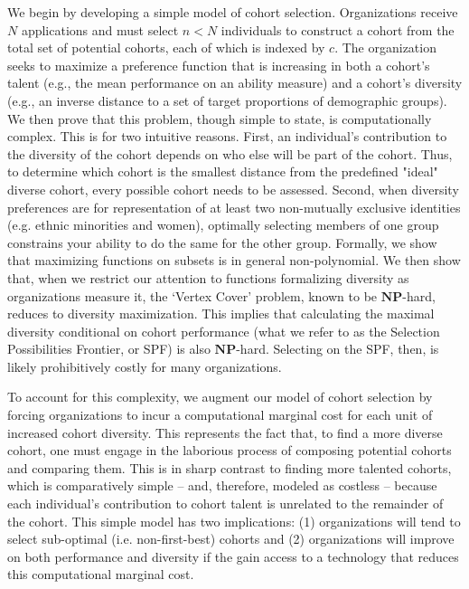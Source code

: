We begin by developing a simple model of cohort selection. Organizations receive $N$ applications and must select $n<N$ individuals to construct a cohort from the total set of potential cohorts, each of which is indexed by $c$. The organization seeks to maximize a preference function that is increasing in both a cohort's talent (e.g., the mean performance on an ability measure) and a cohort's diversity (e.g., an inverse distance to a set of target proportions of demographic groups). We then prove that this problem, though simple to state, is computationally complex. This is for two intuitive reasons. First, an individual's contribution to the diversity of the cohort depends on who else will be part of the cohort. Thus, to determine which cohort is the smallest distance from the predefined "ideal" diverse cohort, every possible cohort needs to be assessed. Second, when diversity preferences are for representation of at least two non-mutually exclusive identities (e.g. ethnic minorities and women), optimally selecting members of one group constrains your ability to do the same for the other group. Formally, we show that maximizing functions on subsets is in general non-polynomial. We then show that, when we restrict our attention to functions formalizing diversity as organizations measure it, the `Vertex Cover' problem, known to be $\mathbf{NP}$-hard, reduces to diversity maximization. This implies that calculating the maximal diversity conditional on cohort performance (what we refer to as the Selection Possibilities Frontier, or SPF) is also $\mathbf{NP}$-hard. Selecting on the SPF, then, is likely prohibitively costly for many organizations. 

To account for this complexity, we augment our model of cohort selection by forcing organizations to incur a computational marginal cost for each unit of increased cohort diversity. This represents the fact that, to find a more diverse cohort, one must engage in the laborious process of composing potential cohorts and comparing them. This is in sharp contrast to finding more talented cohorts, which is comparatively simple -- and, therefore, modeled as costless -- because each individual's contribution to cohort talent is unrelated to the remainder of the cohort. This simple model has two implications: (1) organizations will tend to select sub-optimal (i.e. non-first-best) cohorts and (2) organizations will improve on both performance and diversity if the gain access to a technology that reduces this computational marginal cost. 

